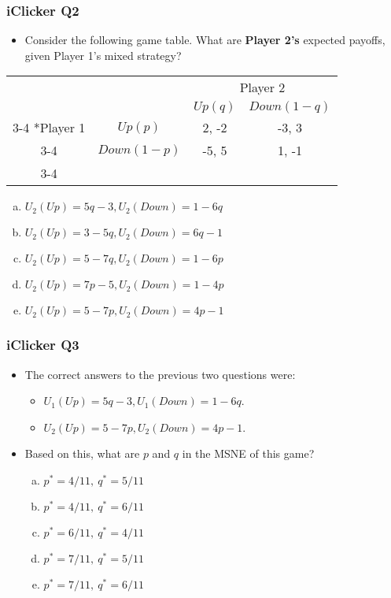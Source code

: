\begin{frame}
\frametitle{iClicker Q2}
\begin{itemize}
\item Consider the following game table. What are \textbf{Player 2's} expected payoffs, given Player 1's mixed strategy?
\end{itemize}
\begin{table}[h]
\centering
\begin{tabular}{cc|c|c|}
& \multicolumn{1}{c}{} & \multicolumn{2}{c}{Player 2}\\
& \multicolumn{1}{c}{} & \multicolumn{1}{c}{$Up (q)$}  & \multicolumn{1}{c}{$Down (1 - q)$} \\\cline{3-4}
\multirow{2}*{Player 1}  & $Up (p)$ & 2, -2 & -3, 3 \\\cline{3-4}
& $Down (1 - p)$ & -5, 5 & 1, -1 \\\cline{3-4}
\end{tabular}
\end{table}
\begin{enumerate}[(a)]
\item $U_2(Up) = 5q - 3, U_2(Down) = 1 - 6q$
\item $U_2(Up) = 3 - 5q, U_2(Down) = 6q - 1$
\item $U_2(Up) = 5 - 7q, U_2(Down) = 1 - 6p$
\item $U_2(Up) = 7p - 5, U_2(Down) = 1 - 4p$
\item $U_2(Up) = 5 - 7p, U_2(Down) = 4p - 1$
\end{enumerate}
\end{frame}

\begin{frame}
\frametitle{iClicker Q3}
\begin{itemize}
\item The correct answers to the previous two questions were:
\begin{itemize}
\item $U_1(Up) = 5q - 3, U_1(Down) = 1 - 6q$.
\item $U_2(Up) = 5 - 7p, U_2(Down) = 4p - 1$.
\end{itemize}
\item Based on this, what are $p$ and $q$ in the MSNE of this game?
\begin{enumerate}[(a)]
\item $p^* = 4/11, \ q^* = 5/11$
\item $p^* = 4/11, \ q^* = 6/11$
\item $p^* = 6/11, \ q^* = 4/11$
\item $p^* = 7/11, \ q^* = 5/11$
\item $p^* = 7/11, \ q^* = 6/11$
\end{enumerate}
\end{itemize}
\end{frame}


